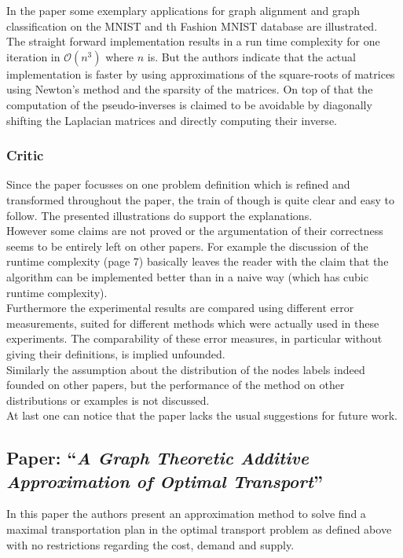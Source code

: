 \documentclass[twoside,twocolumn]{scrartcl}
\begin{document}
In the paper some exemplary applications for graph alignment and graph classification on the MNIST and th Fashion MNIST database are illustrated.\\
The straight forward implementation results in a run time complexity for one iteration in $\mathcal{O}(n^3)$ where $n$ is. But the authors indicate that the actual implementation is faster by using approximations of the square-roots of matrices using Newton's method and the sparsity of the matrices. On top of that the computation of the pseudo-inverses is claimed to be avoidable by diagonally shifting the Laplacian matrices and directly computing their inverse.

\subsubsection{Critic}
Since the paper focusses on one problem definition which is refined and transformed throughout the paper, the train of though is quite clear and easy to follow. The presented illustrations do support the explanations.\\

However some claims are not proved or the argumentation of their correctness seems to be entirely left on other papers. For example the discussion of the runtime complexity (page 7) basically leaves the reader with the claim that the algorithm can be implemented better than in a naive way (which has cubic runtime complexity).\\

Furthermore the experimental results are compared using different error measurements, suited for different methods which were actually used in these experiments. The comparability of these error measures, in particular without giving their definitions, is implied unfounded.\\
Similarly the assumption about the distribution of the nodes labels indeed founded on other papers, but the performance of the method on other distributions or examples is not discussed.\\

At last one can notice that the paper lacks the usual suggestions for future work.

\subsection{Paper: \enquote{\textit{A Graph Theoretic Additive Approximation of Optimal Transport}}}
In this paper the authors present an approximation method to solve find a maximal transportation plan in the optimal transport problem as defined above with no restrictions regarding the cost, demand and supply.
\end{document}
